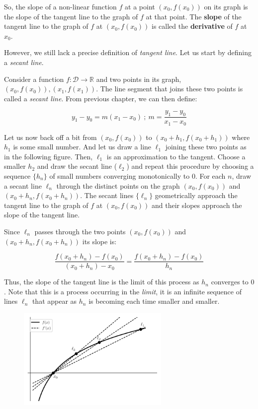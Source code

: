\documentclass[a4paper,11pt]{article}
\theoremstyle{definition}
\theoremstyle{plain}
\begin{document}
    So, the slope of a non-linear function \(f\) at a point
\(\left(x_0,f(x_0)\right)\) on its graph is the slope of the tangent
line to the graph of \(f\) at that point. The \textbf{slope} of the
tangent line to the graph of \(f\) at \(\left(x_0,f(x_0)\right)\) is
called the \textbf{derivative} of \(f\) at \(x_0\).

However, we still lack a precise definition of \emph{tangent line}. Let
us start by defining a \emph{secant line}.

Consider a function \(f : \mathcal{D}\rightarrow\mathbb{R}\) and two
points in its graph,
\(\left(x_0, f(x_0)\right),\left(x_1, f(x_1)\right)\). The line segment
that joins these two points is called a \emph{secant line}. From
previous chapter, we can then define:

\[
y_1 - y_0 = m(x_1 - x_0) \ ; \  m = \frac{y_1 - y_0}{x_1 - x_0}
\]

Let us now back off a bit from \(\left(x_0, f(x_0)\right)\) to
\(\left(x_0+h_1, f(x_0+h_1)\right)\) where \(h_1\) is some small number.
And let us draw a line \(\ell_1\) joining these two points as in the
following figure. Then, \(\ell_1\) is an approximation to the tangent.
Choose a smaller \(h_2\) and draw the secant line (\(\ell_2\)) and
repeat this procedure by choosing a sequence \(\{h_n\}\) of small
numbers converging monotonically to \(0\). For each \(n\), draw a secant
line \(\ell_n\) through the distinct points on the graph
\(\left(x_0, f(x_0)\right)\) and \(\left(x_0+h_n, f(x_0+h_n)\right)\).
The secant lines \(\{\ell_n\}\) geometrically approach the tangent line
to the graph of \(f\) at \(\left(x_0, f(x_0)\right)\) and their slopes
approach the slope of the tangent line.

Since \(\ell_n\) passes through the two points
\(\left(x_0, f(x_0)\right)\) and \(\left(x_0+h_n, f(x_0+h_n)\right)\)
its slope is:

\[
\frac{f(x_0 + h_n) - f(x_0)}{(x_0+h_n)-x_0} = \frac{f(x_0 + h_n) - f(x_0)}{h_n}
\]

Thus, the slope of the tangent line is the limit of this process as
\(h_n\) converges to \(0\). Note that this is a process occurring in the
\emph{limit}, it is an infinite sequence of lines \(\ell_n\) that appear
as \(h_n\) is becoming each time smaller and smaller.

    \begin{figure}[htbp]
    	\centering 
    		\includegraphics[width = 0.65\textwidth]{Ch2_files/Ch2_3_0.pdf}
    \end{figure}
\end{document}
